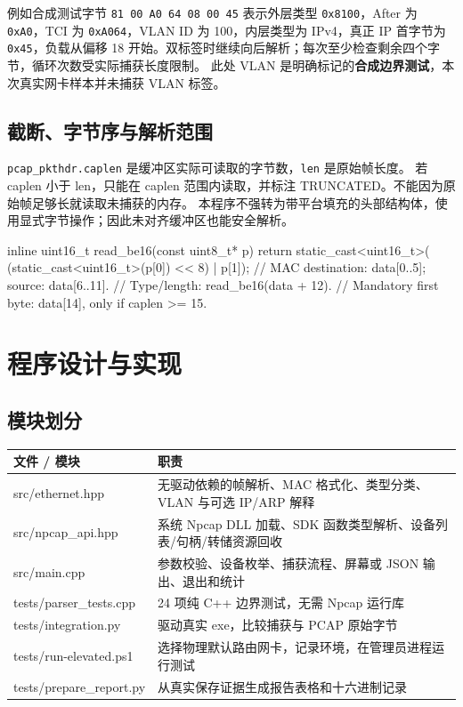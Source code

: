 \documentclass[UTF8,notitlepage,11pt]{ctexart}
\newcommand{\src}[1]{\nolinkurl{#1}}
\begin{document}
例如合成测试字节 \src{81 00 A0 64 08 00 45} 表示外层类型 \src{0x8100}，After 为 \src{0xA0}，TCI 为 \src{0xA064}，VLAN ID 为 100，内层类型为 IPv4，真正 IP 首字节为 \src{0x45}，负载从偏移 18 开始。双标签时继续向后解析；每次至少检查剩余四个字节，循环次数受实际捕获长度限制。
此处 VLAN 是明确标记的\textbf{合成边界测试}，本次真实网卡样本并未捕获 VLAN 标签。

\subsection{截断、字节序与解析范围}
\src{pcap_pkthdr.caplen} 是缓冲区实际可读取的字节数，\src{len} 是原始帧长度。
若 caplen 小于 len，只能在 caplen 范围内读取，并标注 TRUNCATED。不能因为原始帧足够长就读取未捕获的内存。
本程序不强转为带平台填充的头部结构体，使用显式字节操作；因此未对齐缓冲区也能安全解析。

\begin{code}
inline uint16_t read_be16(const uint8_t* p) {
    return static_cast<uint16_t>(
        (static_cast<uint16_t>(p[0]) << 8) | p[1]);
}
// MAC destination: data[0..5]; source: data[6..11].
// Type/length: read_be16(data + 12).
// Mandatory first byte: data[14], only if caplen >= 15.
\end{code}

\section{程序设计与实现}
\subsection{模块划分}
\begin{table}[H]\centering\small
\begin{tabularx}{\textwidth}{p{}X}\toprule
文件 / 模块 & 职责\\\midrule
src/ethernet.hpp & 无驱动依赖的帧解析、MAC 格式化、类型分类、VLAN 与可选 IP/ARP 解释\\
src/npcap\_api.hpp & 系统 Npcap DLL 加载、SDK 函数类型解析、设备列表/句柄/转储资源回收\\
src/main.cpp & 参数校验、设备枚举、捕获流程、屏幕或 JSON 输出、退出和统计\\
tests/parser\_tests.cpp & 24 项纯 C++ 边界测试，无需 Npcap 运行库\\
tests/integration.py & 驱动真实 exe，比较捕获与 PCAP 原始字节\\
tests/run-elevated.ps1 & 选择物理默认路由网卡，记录环境，在管理员进程运行测试\\
tests/prepare\_report.py & 从真实保存证据生成报告表格和十六进制记录\\\bottomrule
\end{tabularx}\end{table}
\end{document}

